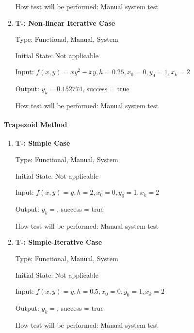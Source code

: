 \documentclass[12pt, titlepage]{article}
\newcounter{tnum} %
\begin{document}
\begin{enumerate}
How test will be performed: Manual system test

\item{\textbf{T-\thetnum \label{t-euler_nonlineariterative}: Non-linear Iterative Case}}

Type: Functional, Manual, System %
					
Initial State: Not applicable
					
Input: $f(x, y) = xy^2 - xy, h = 0.25, x_0 = 0, y_0 = 1, x_k = 2$
					
Output: $y_k = 0.152774$, success = true
					
How test will be performed: Manual system test

\end{enumerate}

\paragraph{Trapezoid Method}
\begin{enumerate}

\item{\textbf{T-\thetnum \label{t-trap_simple}: Simple Case}}

Type: Functional, Manual, System %
					
Initial State: Not applicable
					
Input: $f(x, y) = y, h = 2, x_0 = 0, y_0 = 1, x_k = 2$
					
Output: $y_k = $, success = true
					
How test will be performed: Manual system test

\item{\textbf{T-\thetnum \label{t-trap_simpleiterative}: Simple-Iterative Case}}

Type: Functional, Manual, System %
					
Initial State: Not applicable
					
Input: $f(x, y) = y, h = 0.5, x_0 = 0, y_0 = 1, x_k = 2$
					
Output: $y_k = $, success = true
					
How test will be performed: Manual system test

\end{enumerate}
\end{document}
